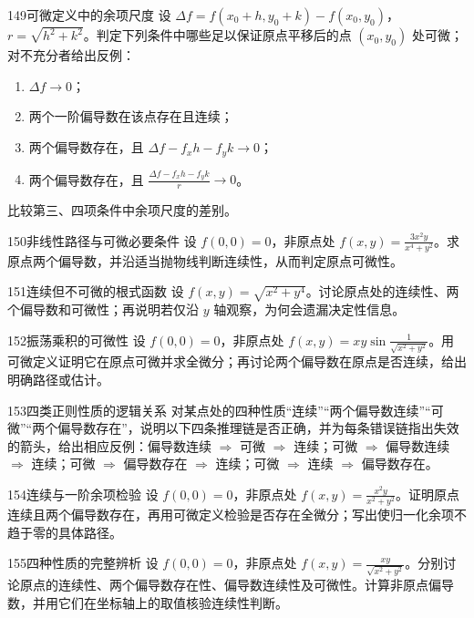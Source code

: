 \begin{exercise}{149}{可微定义中的余项尺度}
设 $\Delta f=f(x_0+h,y_0+k)-f(x_0,y_0)$，$r=\sqrt{h^2+k^2}$。判定下列条件中哪些足以保证原点平移后的点 $(x_0,y_0)$ 处可微；对不充分者给出反例：
\begin{enumerate}
\item $\Delta f\to0$；
\item 两个一阶偏导数在该点存在且连续；
\item 两个偏导数存在，且 $\Delta f-f_xh-f_yk\to0$；
\item 两个偏导数存在，且 $\frac{\Delta f-f_xh-f_yk}r\to0$。
\end{enumerate}
比较第三、四项条件中余项尺度的差别。
\end{exercise}
\begin{exercise}{150}{非线性路径与可微必要条件}
设 $f(0,0)=0$，非原点处 $f(x,y)=\frac{3x^2y}{x^4+y^2}$。求原点两个偏导数，并沿适当抛物线判断连续性，从而判定原点可微性。
\end{exercise}
\begin{exercise}{151}{连续但不可微的根式函数}
设 $f(x,y)=\sqrt{x^2+y^4}$。讨论原点处的连续性、两个偏导数和可微性；再说明若仅沿 $y$ 轴观察，为何会遗漏决定性信息。
\end{exercise}
\begin{exercise}{152}{振荡乘积的可微性}
设 $f(0,0)=0$，非原点处 $f(x,y)=xy\sin\frac1{\sqrt{x^2+y^2}}$。用可微定义证明它在原点可微并求全微分；再讨论两个偏导数在原点是否连续，给出明确路径或估计。
\end{exercise}
\begin{exercise}{153}{四类正则性质的逻辑关系}
对某点处的四种性质“连续”“两个偏导数连续”“可微”“两个偏导数存在”，说明以下四条推理链是否正确，并为每条错误链指出失效的箭头，给出相应反例：偏导数连续 $\Rightarrow$ 可微 $\Rightarrow$ 连续；可微 $\Rightarrow$ 偏导数连续 $\Rightarrow$ 连续；可微 $\Rightarrow$ 偏导数存在 $\Rightarrow$ 连续；可微 $\Rightarrow$ 连续 $\Rightarrow$ 偏导数存在。
\end{exercise}
\begin{exercise}{154}{连续与一阶余项检验}
设 $f(0,0)=0$，非原点处 $f(x,y)=\frac{x^2y}{x^2+y^2}$。证明原点连续且两个偏导数存在，再用可微定义检验是否存在全微分；写出使归一化余项不趋于零的具体路径。
\end{exercise}
\begin{exercise}{155}{四种性质的完整辨析}
设 $f(0,0)=0$，非原点处 $f(x,y)=\frac{xy}{\sqrt{x^2+y^2}}$。分别讨论原点的连续性、两个偏导数存在性、偏导数连续性及可微性。计算非原点偏导数，并用它们在坐标轴上的取值核验连续性判断。
\end{exercise}
